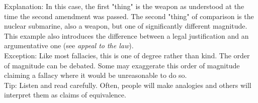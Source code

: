 \documentclass[a4paper,12pt,single,pdftex]{scrartcl}
\begin{document}
    
      Explanation: In this case, the first "thing" is the weapon as understood at the time the second amendment was passed. The second "thing" of comparison is the nuclear submarine, also a weapon, but one of significantly different magnitude. This example also introduces the difference between a legal justification and an argumentative one (see {\it appeal to the law}).
    \\

    
      Exception: Like most fallacies, this is one of degree rather than kind. The order of magnitude can be debated. Some may exaggerate this order of magnitude claiming a fallacy where it would be unreasonable to do so.
    \\

    
      Tip: Listen and read carefully. Often, people will make analogies and others will interpret them as claims of equivalence.
    \\
\end{document}
